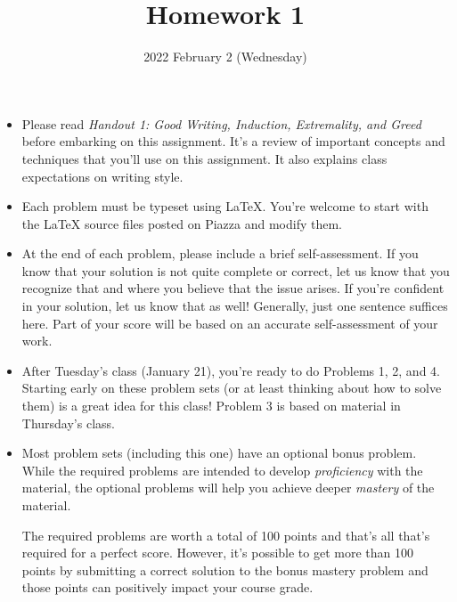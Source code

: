 \documentclass{ks-pset}
\title{Homework 1}
\author{}
\date{2022 February 2 (Wednesday)}
\begin{document}
\begin{itemize}
  \item Please read \emph{Handout 1:  Good Writing, Induction, Extremality, and
    Greed} before embarking on this assignment.  It's a review of important
    concepts and techniques that you'll use on this assignment.  It also
    explains class expectations on writing style.

  \item Each problem must be typeset using \LaTeX.  You're welcome to start
    with the \LaTeX{} source files posted on Piazza and modify them.

  \item At the end of each problem, please include a brief self-assessment.  If
    you know that your solution is not quite complete or correct, let us know
    that you recognize that and where you believe that the issue arises.  If
    you're confident in your solution, let us know that as well! Generally,
    just one sentence suffices here.  Part of your score will be based on an
    accurate self-assessment of your work.

  \item After Tuesday's class (January 21), you're ready to do Problems 1, 2,
    and 4.  Starting early on these problem sets (or at least thinking about how
    to solve them) is a great idea for this class! Problem 3 is based on
    material in Thursday's class.

  \item Most problem sets (including this one) have an optional bonus problem.
    While the required problems are intended to develop \emph{proficiency} with
    the material, the optional problems will help you achieve deeper
    \emph{mastery} of the material.

  The required problems are worth a total of 100 points and that's all that's
  required for a perfect score.  However, it's possible to get more than 100
  points by submitting a correct solution to the bonus mastery problem and
  those points can positively impact your course grade.
\end{itemize}

\newpage
\end{document}
